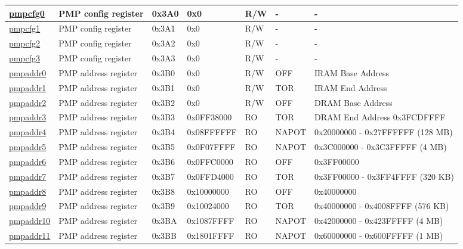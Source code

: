 \begin{longtable}[c]{ | l | l | l | l | l| L{1.8cm}| L{2.23cm}| }
\hyperref[sec:riscvcpu-pmp-reg-desc]{pmpcfg0} & PMP config register & 0x3A0 & 0x0 & R/W & - & - \\\hline
\hyperref[sec:riscvcpu-pmp-reg-desc]{pmpcfg1} & PMP config register & 0x3A1 & 0x0 & R/W & - & - \\\hline
\hyperref[sec:riscvcpu-pmp-reg-desc]{pmpcfg2} & PMP config register & 0x3A2 & 0x0 & R/W & - & - \\\hline
\hyperref[sec:riscvcpu-pmp-reg-desc]{pmpcfg3} & PMP config register & 0x3A3 & 0x0 & R/W & - & - \\\hline
\hyperref[sec:riscvcpu-pmp-reg-desc]{pmpaddr0} & PMP address register & 0x3B0 & 0x0 & R/W & OFF & IRAM Base Address \\\hline
\hyperref[sec:riscvcpu-pmp-reg-desc]{pmpaddr1} & PMP address register & 0x3B1 & 0x0 & R/W & TOR  & IRAM End Address\\\hline
\hyperref[sec:riscvcpu-pmp-reg-desc]{pmpaddr2} & PMP address register & 0x3B2 & 0x0 & R/W & OFF & DRAM Base Address \\\hline
\hyperref[sec:riscvcpu-pmp-reg-desc]{pmpaddr3} & PMP address register & 0x3B3 & 0x0FF38000 & RO & TOR & DRAM End Address 0x3FCDFFFF \\\hline
\hyperref[sec:riscvcpu-pmp-reg-desc]{pmpaddr4} & PMP address register & 0x3B4 & 0x08FFFFFF & RO & NAPOT & 0x20000000 - 0x27FFFFFF (128 MB) \\\hline
\hyperref[sec:riscvcpu-pmp-reg-desc]{pmpaddr5} & PMP address register & 0x3B5 & 0x0F07FFFF& RO & NAPOT & 0x3C000000 - 0x3C3FFFFF (4 MB) \\\hline
\hyperref[sec:riscvcpu-pmp-reg-desc]{pmpaddr6} & PMP address register & 0x3B6 & 0x0FFC0000 & RO & OFF & 0x3FF00000 \\\hline
\hyperref[sec:riscvcpu-pmp-reg-desc]{pmpaddr7} & PMP address register & 0x3B7 & 0x0FFD4000 & RO & TOR & 0x3FF00000 - 0x3FF4FFFF (320 KB)\\\hline
\hyperref[sec:riscvcpu-pmp-reg-desc]{pmpaddr8} & PMP address register & 0x3B8 & 0x10000000 & RO & OFF & 0x40000000 \\\hline
\hyperref[sec:riscvcpu-pmp-reg-desc]{pmpaddr9} & PMP address register & 0x3B9 & 0x10024000 & RO & TOR & 0x40000000 - 0x4008FFFF (576 KB) \\\hline
\hyperref[sec:riscvcpu-pmp-reg-desc]{pmpaddr10} & PMP address register & 0x3BA & 0x1087FFFF & RO & NAPOT & 0x42000000 - 0x423FFFFF (4 MB) \\\hline
\hyperref[sec:riscvcpu-pmp-reg-desc]{pmpaddr11} & PMP address register & 0x3BB & 0x1801FFFF & RO & NAPOT & 0x60000000 - 0x600FFFFF (1 MB)\\\hline

\end{longtable}
